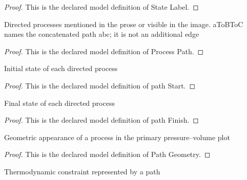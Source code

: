 \begin{proof}
  This is the declared model definition of State Label.
\end{proof}
\begin{definition}
  \label{def:physics:phyx-mini-0494:phyxminiproblems-problemphyxmini0494-processpath}
  Directed processes mentioned in the prose or visible in the image. aToBToC names the concatenated path abc; it is not an additional edge
\end{definition}
\begin{proof}
  This is the declared model definition of Process Path.
\end{proof}
\begin{definition}
  \label{def:physics:phyx-mini-0494:phyxminiproblems-problemphyxmini0494-pathstart}
  Initial state of each directed process
\end{definition}
\begin{proof}
  This is the declared model definition of path Start.
\end{proof}
\begin{definition}
  \label{def:physics:phyx-mini-0494:phyxminiproblems-problemphyxmini0494-pathfinish}
  Final state of each directed process
\end{definition}
\begin{proof}
  This is the declared model definition of path Finish.
\end{proof}
\begin{definition}
  \label{def:physics:phyx-mini-0494:phyxminiproblems-problemphyxmini0494-pathgeometry}
  Geometric appearance of a process in the primary pressure--volume plot
\end{definition}
\begin{proof}
  This is the declared model definition of Path Geometry.
\end{proof}
\begin{definition}
  \label{def:physics:phyx-mini-0494:phyxminiproblems-problemphyxmini0494-processkind}
  Thermodynamic constraint represented by a path
\end{definition}
